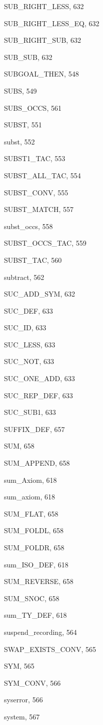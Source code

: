 \begin{theindex}
  \item {\ptt SUB\_RIGHT\_LESS}, 632
  \item {\ptt SUB\_RIGHT\_LESS\_EQ}, 632
  \item {\ptt SUB\_RIGHT\_SUB}, 632
  \item {\ptt SUB\_SUB}, 632
  \item {\ptt SUBGOAL\_THEN}, 548
  \item {\ptt SUBS}, 549
  \item {\ptt SUBS\_OCCS}, 561
  \item {\ptt SUBST}, 551
  \item {\ptt subst}, 552
  \item {\ptt SUBST1\_TAC}, 553
  \item {\ptt SUBST\_ALL\_TAC}, 554
  \item {\ptt SUBST\_CONV}, 555
  \item {\ptt SUBST\_MATCH}, 557
  \item {\ptt subst\_occs}, 558
  \item {\ptt SUBST\_OCCS\_TAC}, 559
  \item {\ptt SUBST\_TAC}, 560
  \item {\ptt subtract}, 562
  \item {\ptt SUC\_ADD\_SYM}, 632
  \item {\ptt SUC\_DEF}, 633
  \item {\ptt SUC\_ID}, 633
  \item {\ptt SUC\_LESS}, 633
  \item {\ptt SUC\_NOT}, 633
  \item {\ptt SUC\_ONE\_ADD}, 633
  \item {\ptt SUC\_REP\_DEF}, 633
  \item {\ptt SUC\_SUB1}, 633
  \item {\ptt SUFFIX\_DEF}, 657
  \item {\ptt SUM}, 658
  \item {\ptt SUM\_APPEND}, 658
  \item {\ptt sum\_Axiom}, 618
  \item {\ptt sum\_axiom}, 618
  \item {\ptt SUM\_FLAT}, 658
  \item {\ptt SUM\_FOLDL}, 658
  \item {\ptt SUM\_FOLDR}, 658
  \item {\ptt sum\_ISO\_DEF}, 618
  \item {\ptt SUM\_REVERSE}, 658
  \item {\ptt SUM\_SNOC}, 658
  \item {\ptt sum\_TY\_DEF}, 618
  \item {\ptt suspend\_recording}, 564
  \item {\ptt SWAP\_EXISTS\_CONV}, 565
  \item {\ptt SYM}, 565
  \item {\ptt SYM\_CONV}, 566
  \item {\ptt syserror}, 566
  \item {\ptt system}, 567


\end{theindex}
